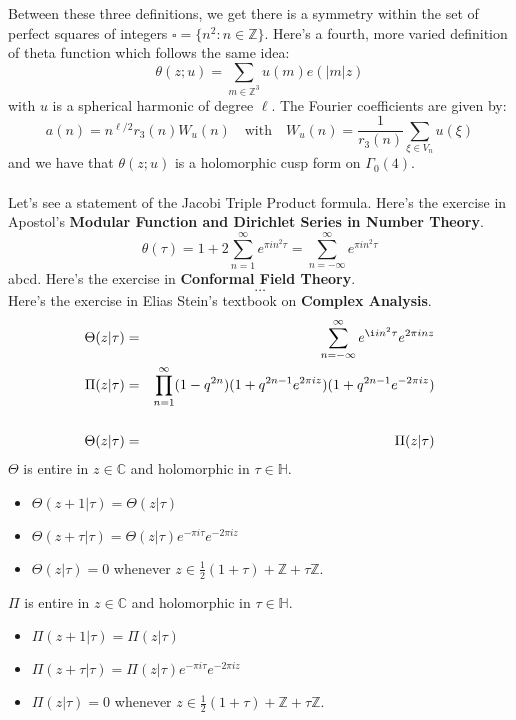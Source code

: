 \documentclass[12pt]{article}
\begin{document}
Between these three definitions, we get there is a symmetry within the set of perfect squares of integers $\square = \{ n^2 : n \in \mathbb{Z} \}$. 
\newpage \noindent
Here's a fourth, more varied definition of theta function which follows the same idea:
$$ \theta(z; u) = \sum_{m \in \mathbb{Z}^3} u(m) e(|m|z) $$
with $u$ is a spherical harmonic of degree $\ell$.  The Fourier coefficients are given by:
$$ a(n) = n^{\ell/2} r_3(n) W_u(n) \quad\text{with}\quad W_u(n) = \frac{1}{r_3(n)} \sum_{\xi \in V_n} u(\xi) $$ 
and we have that $\theta(z;u)$ is a holomorphic cusp form on $\Gamma_0(4)$.  \\ \\
Let's see a statement of the Jacobi Triple Product formula. Here's the exercise in Apostol's \textbf{Modular Function and Dirichlet Series in Number Theory}.  
$$ \theta(\tau) = 1 + 2\sum_{n=1}^\infty e^{\pi i n^2 \tau} = \sum_{n=-\infty}^\infty e^{\pi i n^2 \tau}  $$
abcd.
Here's the exercise in \textbf{Conformal Field Theory}.  
$$ \dots $$
Here's the exercise in Elias Stein's textbook on \textbf{Complex Analysis}. 
\begin{eqnarray*}
\Theta(z|\tau) &=& \sum_{n=-\infty}^\infty e^{\i i n^2 \tau} e^{2\pi i n z} \\
\Pi(z|\tau) &=& \prod_{n=1}^\infty (1 - q^{2n}) (1 + q^{2n-1}e^{2\pi i z})(1 + q^{2n-1} e^{-2\pi i z}) \\ \\
\Theta(z|\tau) &=& \Pi (z|\tau) 
\end{eqnarray*}
$\Theta$ is entire in $z \in \mathbb{C}$ and holomorphic in $\tau \in \mathbb{H}$. 
\begin{itemize}
\item $\Theta(z+1|\tau) = \Theta(z|\tau) $
\item $\Theta(z+\tau|\tau) = \Theta(z|\tau) e^{- \pi i \tau} e^{-2\pi i z} $
\item $\Theta(z|\tau) = 0 $ whenever $z \in \frac{1}{2}(1 + \tau) + \mathbb{Z} + \tau \mathbb{Z} $.
\end{itemize} 
$\Pi$ is entire in $z \in \mathbb{C}$ and holomorphic in $\tau \in \mathbb{H}$. 
\begin{itemize}
\item $\Pi(z+1|\tau) = \Pi(z|\tau) $
\item $\Pi(z+\tau|\tau) = \Pi(z|\tau) e^{-\pi i \tau}e^{-2\pi i z } $
\item $\Pi(z|\tau) = 0$ whenever $z \in \frac{1}{2}(1 + \tau) + \mathbb{Z} + \tau \mathbb{Z}$. 
\end{itemize}
\vfill
\begin{thebibliography}{} 
\item 
\end{thebibliography}
\end{document}
